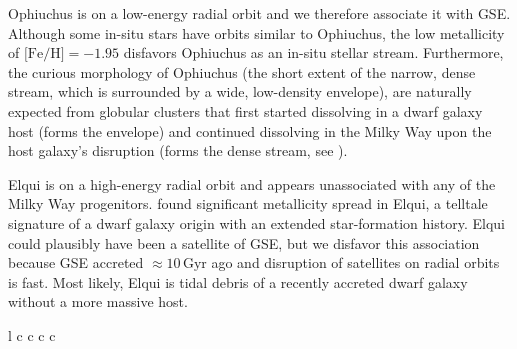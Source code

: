 \documentclass[twocolumn]{aastex63}
\newcommand{\gyr}{\ensuremath{\textrm{Gyr}}}
\newcommand{\feh}{\ensuremath{\textrm{[Fe/H]}}}
\begin{document}
Ophiuchus is on a low-energy radial orbit and we therefore associate it with GSE.
Although some in-situ stars have orbits similar to Ophiuchus, the low metallicity of $\feh=-1.95$ \citep{sesar2015} disfavors Ophiuchus as an in-situ stellar stream.
Furthermore, the curious morphology of Ophiuchus (the short extent of the narrow, dense stream, which is surrounded by a wide, low-density envelope), are naturally expected from globular clusters that first started dissolving in a dwarf galaxy host (forms the envelope) and continued dissolving in the Milky Way upon the host galaxy's disruption (forms the dense stream, see \citealt{carlberg2018, malhan2020}).


Elqui is on a high-energy radial orbit and appears unassociated with any of the Milky Way progenitors.
\citet{ji2020} found significant metallicity spread in Elqui, a telltale signature of a dwarf galaxy origin with an extended star-formation history.
Elqui could plausibly have been a satellite of GSE, but we disfavor this association because GSE accreted $\approx10\,\gyr$ ago \citep{bonaca2020c} and disruption of satellites on radial orbits is fast.
Most likely, Elqui is tidal debris of a recently accreted dwarf galaxy without a more massive host.

\begin{deluxetable*}{l c c c c}
\decimals
\startdata

\enddata
\caption{
The origins of stellar streams in the Milky Way.
Progenitor is the object that dissolved to create the stellar stream.
The last column determines the progenitor as globular cluster (GC) or dwarf galaxy (DG).
Host galaxy is the galaxy that brought the stream progenitor into the Milky Way.
Tentative host galaxy candidates and progenitors are placed in parentheses.
}
\label{table}
\end{deluxetable*}
\end{document}
